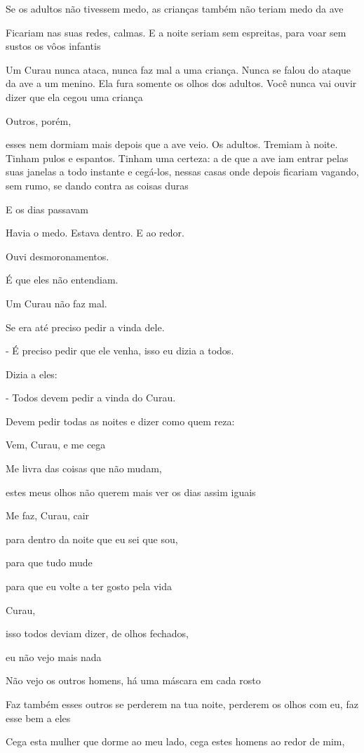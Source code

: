 Se os adultos não tivessem medo, as crianças também não teriam medo da
ave

Ficariam nas suas redes, calmas. E a noite seriam sem espreitas, para
voar sem sustos os vôos infantis

Um Curau nunca ataca, nunca faz mal a uma criança. Nunca se falou do
ataque da ave a um menino. Ela fura somente os olhos dos adultos. Você
nunca vai ouvir dizer que ela cegou uma criança

Outros, porém,

esses nem dormiam mais depois que a ave veio. Os adultos. Tremiam à
noite. Tinham pulos e espantos. Tinham uma certeza: a de que a ave iam
entrar pelas suas janelas a todo instante e cegá-los, nessas casas onde
depois ficariam vagando, sem rumo, se dando contra as coisas duras

E os dias passavam

Havia o medo. Estava dentro. E ao redor.

Ouvi desmoronamentos.

É que eles não entendiam.

Um Curau não faz mal.

Se era até preciso pedir a vinda dele.

- É preciso pedir que ele venha, isso eu dizia a todos.

Dizia a eles:

- Todos devem pedir a vinda do Curau.

Devem pedir todas as noites e dizer como quem reza:

Vem, Curau, e me cega

Me livra das coisas que não mudam,

estes meus olhos não querem mais ver os dias assim iguais

Me faz, Curau, cair

para dentro da noite que eu sei que sou,

para que tudo mude

para que eu volte a ter gosto pela vida

Curau,

isso todos deviam dizer, de olhos fechados,

eu não vejo mais nada

Não vejo os outros homens, há uma máscara em cada rosto

Faz também esses outros se perderem na tua noite, perderem os olhos com
eu, faz esse bem a eles

Cega esta mulher que dorme ao meu lado, cega estes homens ao redor de
mim,

